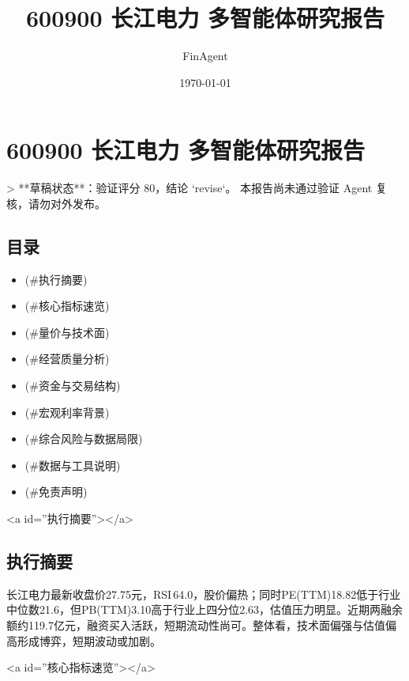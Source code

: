 \documentclass[12pt,a4paper]{article}
\title{600900 长江电力 多智能体研究报告}
\author{FinAgent}
\date{\today}
\begin{document}
\maketitle
\tableofcontents
\newpage
\sloppy
\section{600900 长江电力 多智能体研究报告}

> **草稿状态**：验证评分 80，结论 `revise`。 本报告尚未通过验证 Agent 复核，请勿对外发布。

\subsection{ 目录}

\begin{itemize}
\item [执行摘要](\#执行摘要)
\item [核心指标速览](\#核心指标速览)
\item [量价与技术面](\#量价与技术面)
\item [经营质量分析](\#经营质量分析)
\item [资金与交易结构](\#资金与交易结构)
\item [宏观利率背景](\#宏观利率背景)
\item [综合风险与数据局限](\#综合风险与数据局限)
\item [数据与工具说明](\#数据与工具说明)
\item [免责声明](\#免责声明)
\end{itemize}

<a id=''执行摘要''></a>

\subsection{ 执行摘要}
长江电力最新收盘价27.75元，RSI 64.0，股价偏热；同时PE(TTM)18.82低于行业中位数21.6，但PB(TTM)3.10高于行业上四分位2.63，估值压力明显。近期两融余额约119.7亿元，融资买入活跃，短期流动性尚可。整体看，技术面偏强与估值偏高形成博弈，短期波动或加剧。

<a id=''核心指标速览''></a>
\end{document}
